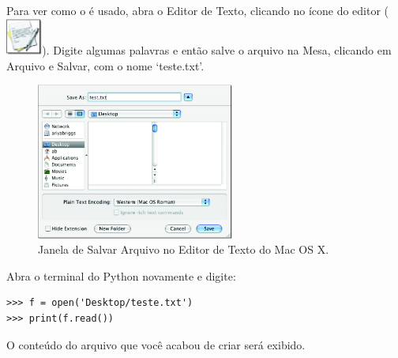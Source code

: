 \begin{MAC}
Para ver como o  é usado, abra o Editor de Texto, clicando no ícone do editor (\includegraphics[width=12mm]{eps/textedit-icon.eps}). Digite algumas palavras e então salve o arquivo na Mesa, clicando em Arquivo e Salvar, com o nome `teste.txt'.

\begin{figure}
\begin{center}
\includegraphics[width=65mm]{eps/figure18.eps}
\end{center}
\caption{Janela de Salvar Arquivo no Editor de Texto do Mac OS X.}\label{fig18}
\end{figure}

Abra o terminal do Python novamente e digite:

\begin{listing}
\begin{verbatim}
>>> f = open('Desktop/teste.txt')
>>> print(f.read())
\end{verbatim}
\end{listing}

O conteúdo do arquivo que você acabou de criar será exibido.
\end{MAC}


